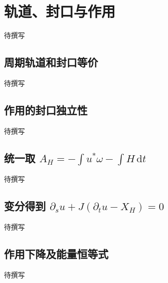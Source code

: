 
% 
% 

\section{轨道、封口与作用}
\label{g4:sec:2501}

待撰写

\subsection{周期轨道和封口等价}
\label{g4:subsec:2501:01}
待撰写

\subsection{作用的封口独立性}
\label{g4:subsec:2501:02}
待撰写

\subsection{\texorpdfstring{统一取 \(A_H=-\int u^*\omega-\int H\,\mathrm{d}t\)}{统一取 A\_H=−∫u*\GeometryPdfSmallOmega{}−∫Hdt}}
\label{g4:subsec:2501:03}
待撰写

\subsection{\texorpdfstring{变分得到 \(\partial_su+J(\partial_tu-X_H)=0\)}{变分得到 ∂su+J(∂tu−X\_H)=0}}
\label{g4:subsec:2501:04}
待撰写

\subsection{作用下降及能量恒等式}
\label{g4:subsec:2501:05}
待撰写
